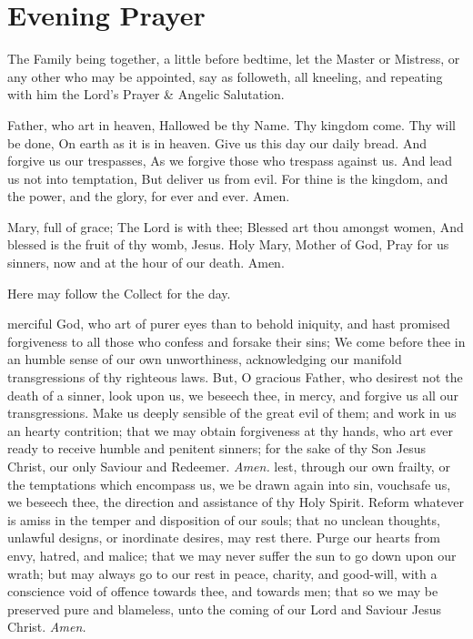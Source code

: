 \section*{Evening Prayer}
\vspace{-1.75\baselineskip}
\begin{rubric}
    The Family being together, a little before bedtime, let the Master or Mistress, or any other who may be appointed, say as followeth, all kneeling, and repeating with him the Lord's Prayer \& Angelic Salutation.
\end{rubric}
 Father, who art in heaven, Hallowed be thy Name. Thy kingdom come. Thy will be done, On earth as it is in heaven. Give us this day our daily bread. And forgive us our trespasses, As we forgive those who trespass against us. And lead us not into temptation, But deliver us from evil. For thine is the kingdom, and the power, and the glory, for ever and ever. Amen.\par
{}
 Mary, full of grace; The Lord is with thee; Blessed art thou amongst women, And blessed is the fruit of thy womb, Jesus. Holy Mary, Mother of God, Pray for us sinners, now and at the hour of our death. Amen.
\begin{rubric}
    Here may follow the Collect for the day.
\end{rubric}
 merciful God, who art of purer eyes than to behold iniquity, and hast promised forgiveness to all those who confess and forsake their sins; We come before thee in an humble sense of our own unworthiness, acknowledging our manifold transgressions of thy righteous laws. But, O gracious Father, who desirest not the death of a sinner, look upon us, we beseech thee, in mercy, and forgive us all our transgressions. Make us deeply sensible of the great evil of them; and work in us an hearty contrition; that we may obtain forgiveness at thy hands, who art ever ready to receive humble and penitent sinners; for the sake of thy Son Jesus Christ, our only Saviour and Redeemer. \textit{Amen.}
 lest, through our own frailty, or the temptations which encompass us, we be drawn again into sin, vouchsafe us, we beseech thee, the direction and assistance of thy Holy Spirit. Reform whatever is amiss in the temper and disposition of our souls; that no unclean thoughts, unlawful designs, or inordinate desires, may rest there. Purge our hearts from envy, hatred, and malice; that we may never suffer the sun to go down upon our wrath; but may always go to our rest in peace, charity, and good-will, with a conscience void of offence towards thee, and towards men; that so we may be preserved pure and blameless, unto the coming of our Lord and Saviour Jesus Christ. \textit{Amen.}
